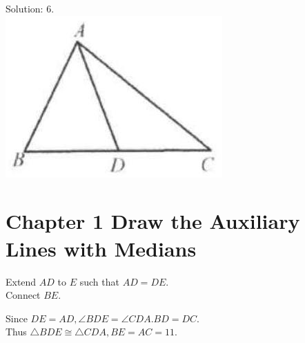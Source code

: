 \documentclass[10pt]{article}
\begin{document}
Solution: 6.\\
\includegraphics[max width=\textwidth, center]{2025_04_17_97bc1f7e44d93c271a88g-024(3)}

\section*{Chapter 1 Draw the Auxiliary Lines with Medians}
Extend \(A D\) to \(E\) such that \(A D=D E\).\\
Connect \(B E\).

Since \(D E=A D, \angle B D E=\angle C D A . B D=D C\).\\
Thus \(\triangle B D E \cong \triangle C D A, B E=A C=11\).
\end{document}
